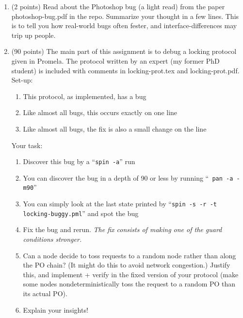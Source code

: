 \documentclass[11pt]{article}
\begin{document}
\begin{enumerate}
\begin{minipage}{\minpagw}
\end{minipage}
\item (2 points) Read about the Photoshop bug (a light read) from the paper photoshop-bug.pdf in the repo.
  Summarize your thought in a few lines. This is to tell you how real-world bugs often fester, and
  interface-differences may trip up people.
  
\item (90 points)
  The main part of this assignment is to debug a locking protocol given in
  Promela. The protocol written by an expert (my former PhD student) is included
  with comments in locking-prot.tex and locking-prot.pdf.
  Set-up:
  \begin{enumerate}
  \item This protocol, as implemented, has a bug
  \item Like almost all bugs, this occurs exactly on one line
  \item Like almost all bugs, the fix is also a small change on the line
  \end{enumerate}
  Your task:
  \begin{enumerate}
  \item Discover this bug by a ``{\tt spin -a}'' run
  \item You can discover the bug in a depth of 90 or less by running  ``{\tt
    pan -a -m90}'' 
  \item You can simply look at the last state printed by
    ``{\tt spin  -s -r -t locking-buggy.pml}'' and spot the bug
  \item Fix the bug and rerun. {\em The fix consists of making one of the guard conditions stronger.}
  \item Can a node decide to toss  requests to a random node rather than along the PO chain?
    (It might do this to avoid network congestion.) Justify this, and implement + verify in
    the fixed version of your protocol (make some nodes nondeterministically toss the
    request to a random PO than its actual PO).
  \item Explain your insights!
  \end{enumerate}  


\begin{minipage}{\minpagw}
\end{minipage}  
\end{enumerate}
\end{document}
